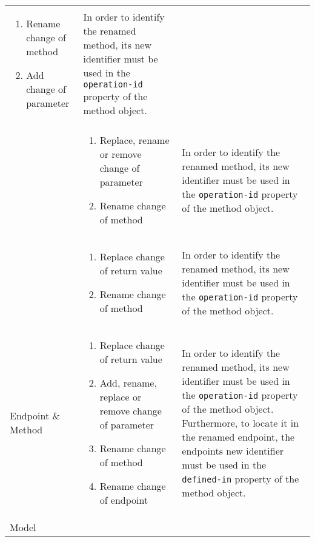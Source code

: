 \begin{longtable}{@{}p{}>{\raggedright\arraybackslash}p{}p{}@{}}
\begin{enumerate}[leftmargin=*]
		\setlength\itemsep{0.05em}
		\item Rename change of method
		\item Add change of parameter
	\end{enumerate}           &     In order to identify the renamed method, its new identifier must be used in the \texttt{operation-id} property of the method object.      \\
&      \vspace{-2em}\begin{enumerate}[leftmargin=*]
	\setlength\itemsep{0.05em}
	\item Replace, rename or remove change of parameter
	\item Rename change of method
\end{enumerate}           &     In order to identify the renamed method, its new identifier must be used in the \texttt{operation-id} property of the method object.      \\
&      \vspace{-2em}\begin{enumerate}[leftmargin=*]
	\setlength\itemsep{0.05em}
	\item Replace change of return value
	\item Rename change of method
\end{enumerate}           &     In order to identify the renamed method, its new identifier must be used in the \texttt{operation-id} property of the method object.      \\
		Endpoint \newline\& Method       &       \vspace{-2em}\begin{enumerate}[leftmargin=*]
			\setlength\itemsep{0.05em}
			\item Replace change of return value
			\item Add, rename, replace or remove change of parameter
			\item Rename change of method
			\item Rename change of endpoint
		\end{enumerate}           &     In order to identify the renamed method, its new identifier must be used in the \texttt{operation-id} property of the method object. Furthermore, to locate it in the renamed endpoint, the endpoints new identifier must be used in the \texttt{defined-in} property of the method object.  \\
		Model                    &         \vspace{-2em}\begin{enumerate}[leftmargin=*]

\end{enumerate}
\end{longtable}
